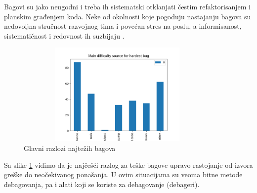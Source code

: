 \documentclass[a4paper]{article}
\begin{document}
Bagovi su jako neugodni i treba ih sistematski otklanjati čestim refaktorisanjem i planskim građenjem koda. Neke od okolnosti koje pogoduju nastajanju bagova su nedovoljna stručnost razvojnog tima i povećan stres na poslu, a informisanost, sistematičnost i redovnost ih suzbijaju \cite{bagovi_smalkov}.

\begin{figure}[h!]
	\begin{center}
		\includegraphics[width=100mm,height=50mm]{Slike/bagovi.png}
	\end{center}
	\caption{Glavni razlozi najtežih bagova \cite{study_bugs}}
	\label{fig:bagovi}
\end{figure}

Sa slike \ref{fig:bagovi} vidimo da je najčešći razlog za teške bagove upravo rastojanje od izvora greške do neočekivanog ponašanja. U ovim situacijama su veoma bitne metode debagovanja, pa i alati koji se koriste za debagovanje (debageri).
\end{document}
